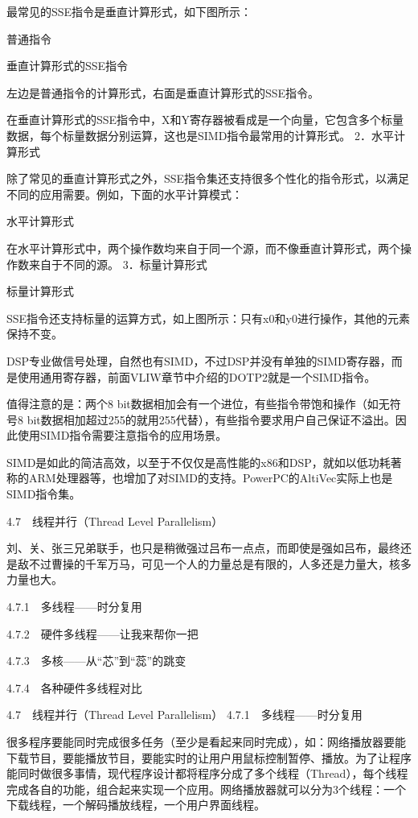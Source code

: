 \documentclass[12pt,UTF8]{ctexbook}
\begin{document}
最常见的SSE指令是垂直计算形式，如下图所示：

普通指令

垂直计算形式的SSE指令

左边是普通指令的计算形式，右面是垂直计算形式的SSE指令。

在垂直计算形式的SSE指令中，X和Y寄存器被看成是一个向量，它包含多个标量数据，每个标量数据分别运算，这也是SIMD指令最常用的计算形式。
2．水平计算形式

除了常见的垂直计算形式之外，SSE指令集还支持很多个性化的指令形式，以满足不同的应用需要。例如，下面的水平计算模式：

水平计算形式

在水平计算形式中，两个操作数均来自于同一个源，而不像垂直计算形式，两个操作数来自于不同的源。
3．标量计算形式

标量计算形式

SSE指令还支持标量的运算方式，如上图所示：只有x0和y0进行操作，其他的元素保持不变。

DSP专业做信号处理，自然也有SIMD，不过DSP并没有单独的SIMD寄存器，而是使用通用寄存器，前面VLIW章节中介绍的DOTP2就是一个SIMD指令。

值得注意的是：两个8 bit数据相加会有一个进位，有些指令带饱和操作（如无符号8 bit数据相加超过255的就用255代替），有些指令要求用户自己保证不溢出。因此使用SIMD指令需要注意指令的应用场景。

SIMD是如此的简洁高效，以至于不仅仅是高性能的x86和DSP，就如以低功耗著称的ARM处理器等，也增加了对SIMD的支持。PowerPC的AltiVec实际上也是SIMD指令集。


4.7　线程并行（Thread Level Parallelism）

刘、关、张三兄弟联手，也只是稍微强过吕布一点点，而即使是强如吕布，最终还是敌不过曹操的千军万马，可见一个人的力量总是有限的，人多还是力量大，核多力量也大。

4.7.1　多线程——时分复用

4.7.2　硬件多线程——让我来帮你一把

4.7.3　多核——从“芯”到“蕊”的跳变

4.7.4　各种硬件多线程对比


4.7　线程并行（Thread Level Parallelism）
4.7.1　多线程——时分复用

很多程序要能同时完成很多任务（至少是看起来同时完成），如：网络播放器要能下载节目，要能播放节目，要能实时的让用户用鼠标控制暂停、播放。为了让程序能同时做很多事情，现代程序设计都将程序分成了多个线程（Thread），每个线程完成各自的功能，组合起来实现一个应用。网络播放器就可以分为3个线程：一个下载线程，一个解码播放线程，一个用户界面线程。
\end{document}
